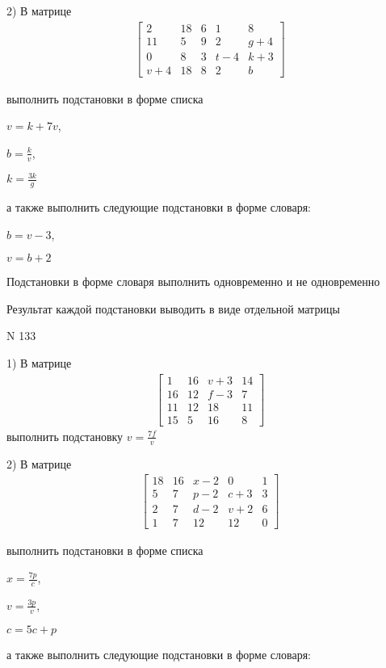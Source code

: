 \documentclass[11pt]{report}
\begin{document}
    2) В матрице
\begin{align*}
\left[\begin{matrix}2 & 18 & 6 & 1 & 8\\11 & 5 & 9 & 2 & g + 4\\0 & 8 & 3 & t - 4 & k + 3\\v + 4 & 18 & 8 & 2 & b\end{matrix}\right]
\end{align*}

выполнить подстановки в форме списка

$v=k + 7 v$,

$b=\frac{k}{v}$,

$k=\frac{3 k}{g}$

а также выполнить следующие подстановки в форме словаря:

$b=v - 3$,

$v=b + 2$


    Подстановки в форме словаря выполнить одновременно и не одновременно


    Результат каждой подстановки выводить в виде отдельной матрицы

\newpage
N 133


    1) В матрице
\begin{align*}
\left[\begin{matrix}1 & 16 & v + 3 & 14\\16 & 12 & f - 3 & 7\\11 & 12 & 18 & 11\\15 & 5 & 16 & 8\end{matrix}\right]
\end{align*}
выполнить подстановку $v=\frac{7 f}{v}$


    2) В матрице
\begin{align*}
\left[\begin{matrix}18 & 16 & x - 2 & 0 & 1\\5 & 7 & p - 2 & c + 3 & 3\\2 & 7 & d - 2 & v + 2 & 6\\1 & 7 & 12 & 12 & 0\end{matrix}\right]
\end{align*}

выполнить подстановки в форме списка

$x=\frac{7 p}{c}$,

$v=\frac{3 p}{v}$,

$c=5 c + p$

а также выполнить следующие подстановки в форме словаря:
\end{document}
